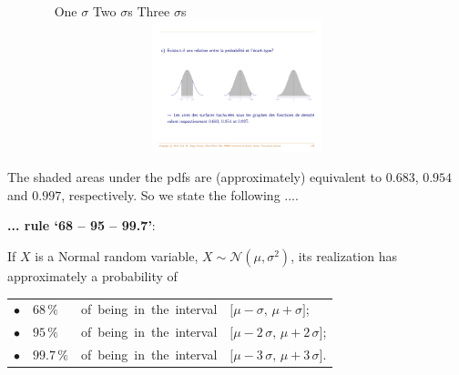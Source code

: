 \documentclass[notes=show,smaller,handout]{beamer}\usepackage[]{graphicx}\usepackage[]{color}
\newcommand{\N}{\mathcal{N}}
\begin{document}
\begin{frame}{\secname}



\begin{figure}[ptb]\centering
\ \hspace{0.6cm} One $\sigma$ \hspace{2.4cm} Two $\sigma$s \hspace{2.5cm} Three $\sigma$s \hspace{3cm}
\includegraphics[height=1.5in, width=4.5in]{img/Areas_Normal.pdf}%
\end{figure}%
The shaded areas under the pdfs are (approximately) equivalent to $0.683$, $0.954$ and $0.997$,
respectively. So we state  the following ....

\end{frame}%



\begin{frame}{\secname}





\textbf{... rule `68 -- 95 -- 99.7'}: \\ \bigskip


If $X$ is a Normal random variable, $X \sim \N(\mu, \sigma^2)$, its realization has approximately a probability of \\ \bigskip

\begin{tabular}{llll}
$\bullet$
&
$68 \, \%$
&
\mbox{of being in the interval}
&
$\lbrack \mu - \sigma, \, \mu + \sigma \rbrack$;\\[0.2cm]
$\bullet$
&
$95 \, \%$
&
\mbox{of being in the interval}
&
$\lbrack \mu - 2 \, \sigma, \, \mu + 2 \, \sigma \rbrack$;\\[0.2cm]
$\bullet$
&
$99.7 \, \%$
&
\mbox{of being in the interval}&
$\lbrack \mu - 3 \, \sigma, \, \mu + 3 \, \sigma \rbrack$.\\[0.2cm]
\end{tabular}
\end{frame}
\end{document}
